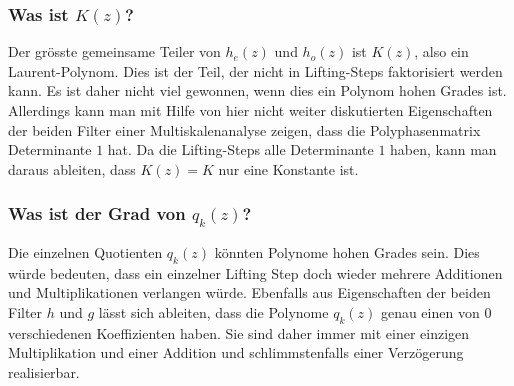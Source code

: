\subsubsection{Was ist $K(z)$?}
Der grösste gemeinsame Teiler von $h_e(z)$ und $h_o(z)$ ist $K(z)$,
also ein Laurent-Polynom.
Dies ist der Teil, der nicht in Lifting-Steps faktorisiert werden kann.
Es ist daher nicht viel gewonnen, wenn dies ein Polynom hohen Grades ist.
Allerdings kann man mit Hilfe von hier nicht weiter diskutierten
Eigenschaften der beiden Filter einer Multiskalenanalyse zeigen,
dass die Polyphasenmatrix Determinante $1$ hat.
Da die Lifting-Steps alle Determinante $1$ haben, kann man daraus
ableiten, dass $K(z)=K$ nur eine Konstante ist.

\subsubsection{Was ist der Grad von $q_k(z)$?}
Die einzelnen Quotienten $q_k(z)$ könnten Polynome hohen Grades sein.
Dies würde bedeuten, dass ein einzelner Lifting Step doch wieder
mehrere Additionen und Multiplikationen verlangen würde.
Ebenfalls aus Eigenschaften der beiden Filter $h$ und $g$ lässt
sich ableiten, dass die Polynome $q_k(z)$ genau einen
von $0$ verschiedenen Koeffizienten haben.
Sie sind daher immer mit einer einzigen Multiplikation und einer
Addition und schlimmstenfalls einer Verzögerung realisierbar.



